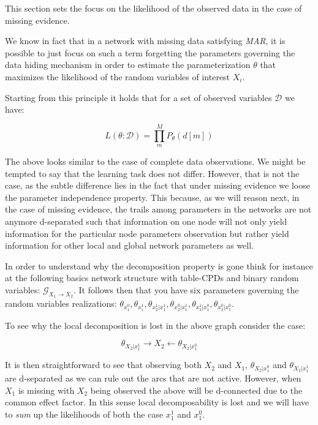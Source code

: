 \documentclass[11pt]{article}
\begin{document}
\begin{article}
This section sets the focus on the likelihood of the observed data
in the case of missing evidence.

We know in fact that in a network with missing data satisfying
\emph{MAR}, it is possible to just focus on such a term forgetting the
parameters governing the data hiding mechanism in order to estimate
the parameterization \(\theta\) that maximizes the likelihood of the
random variables of interest \(X_i\).

Starting from this principle it holds that for a set of observed
variables \(\mathcal{D}\) we have:

$$ L(\theta: \mathcal{D}) = \prod_m^M P_\theta(d[m]) $$

The above looks similar to the case of complete data
observations. We might be tempted to say that the learning task
does not differ. However, that is not the case, as the subtle
difference lies in the fact that under missing evidence we loose
the parameter independence property. This because, as we will
reason next, in the case of missing evidence, the trails among
parameters in the networks are not anymore d-separated such that
information on one node will not only yield information for the
particular node parameters observation but rather yield
information for other local and global network parameters as well.

In order to understand why the decomposition property is gone think
for instance at the following basics network structure with
table-CPDs and binary random variables: \(\mathscr{G}_{X_1
   \rightarrow X_2}\). It follows then that you have six parameters
governing the random variables realizations: \(\theta_{x_1^0},
   \theta_{x_1^1}, \theta_{x_2^1| x_1^1}, \theta_{x_2^0 | x_1^1},
   \theta_{x_2^1 | x_1^0}, \theta_{x_2^0 | x_1^0}\).

To see why the local decomposition is lost in the above graph
consider the case:

$$\theta_{X_2 | x_1^1} \rightarrow X_2 \leftarrow \theta_{X_2 |
   x_1^0}$$

It is then straightforward to see that observing both \(X_2\) and
\(X_1\), \(\theta_{X_2 | x_1^0}\) and \(\theta_{X_2 | x_1^1}\) are
d-separated as we can rule out the arcs that are not
active. However, when \(X_1\) is missing with \(X_2\) being observed
the above will be d-connected due to the common effect factor. In
this sense local decomposability is lost and we will have to \emph{sum}
up the likelihoods of both the case \(x_1^1\) and \(x_1^0\).


\end{article}
\end{document}
